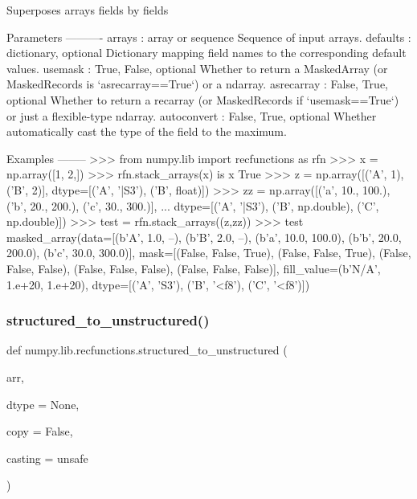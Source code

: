 \begin{DoxyVerb}Superposes arrays fields by fields

Parameters
----------
arrays : array or sequence
    Sequence of input arrays.
defaults : dictionary, optional
    Dictionary mapping field names to the corresponding default values.
usemask : {True, False}, optional
    Whether to return a MaskedArray (or MaskedRecords is
    `asrecarray==True`) or a ndarray.
asrecarray : {False, True}, optional
    Whether to return a recarray (or MaskedRecords if `usemask==True`)
    or just a flexible-type ndarray.
autoconvert : {False, True}, optional
    Whether automatically cast the type of the field to the maximum.

Examples
--------
>>> from numpy.lib import recfunctions as rfn
>>> x = np.array([1, 2,])
>>> rfn.stack_arrays(x) is x
True
>>> z = np.array([('A', 1), ('B', 2)], dtype=[('A', '|S3'), ('B', float)])
>>> zz = np.array([('a', 10., 100.), ('b', 20., 200.), ('c', 30., 300.)],
...   dtype=[('A', '|S3'), ('B', np.double), ('C', np.double)])
>>> test = rfn.stack_arrays((z,zz))
>>> test
masked_array(data=[(b'A', 1.0, --), (b'B', 2.0, --), (b'a', 10.0, 100.0),
                   (b'b', 20.0, 200.0), (b'c', 30.0, 300.0)],
             mask=[(False, False,  True), (False, False,  True),
                   (False, False, False), (False, False, False),
                   (False, False, False)],
       fill_value=(b'N/A', 1.e+20, 1.e+20),
            dtype=[('A', 'S3'), ('B', '<f8'), ('C', '<f8')])\end{DoxyVerb}
 \mbox{\label{namespacenumpy_1_1lib_1_1recfunctions_a55c8ffb5824a0a25bfd52f2b0fb446bf}} 
\subsubsection{\texorpdfstring{structured\+\_\+to\+\_\+unstructured()}{structured\_to\_unstructured()}}
{\footnotesize\ttfamily def numpy.\+lib.\+recfunctions.\+structured\+\_\+to\+\_\+unstructured (\begin{DoxyParamCaption}\item[{}]{arr,  }\item[{}]{dtype = {\ttfamily None},  }\item[{}]{copy = {\ttfamily False},  }\item[{}]{casting = {\ttfamily \textquotesingle{}unsafe\textquotesingle{}} }\end{DoxyParamCaption})}

